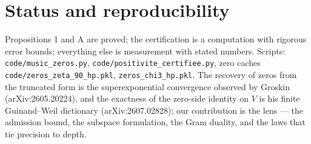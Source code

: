\documentclass[11pt]{article}
\theoremstyle{remark}\newtheorem*{remark}{Remark}
\begin{document}
\section*{Status and reproducibility}
Propositions 1 and A are proved; the certification is a computation with rigorous error bounds; everything else is measurement with stated numbers. Scripts: \texttt{code/music\_zeros.py}, \texttt{code/positivite\_certifiee.py}, zero caches \texttt{code/zeros\_zeta\_90\_hp.pkl}, \texttt{zeros\_chi3\_hp.pkl}. The recovery of zeros from the truncated form is the superexponential convergence observed by Groskin (arXiv:2605.20224), and the exactness of the zero-side identity on $V$ is his finite Guinand--Weil dictionary (arXiv:2607.02828); our contribution is the lens --- the admission bound, the subspace formulation, the Gram duality, and the laws that tie precision to depth.
\end{document}
